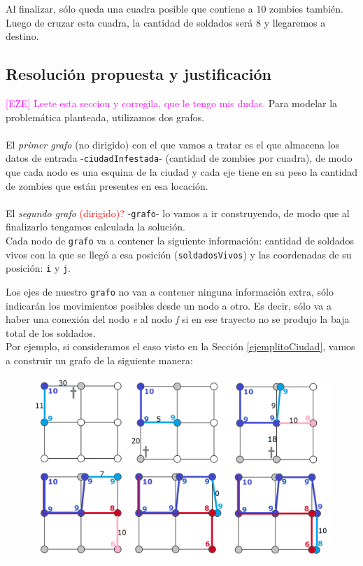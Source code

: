 Al finalizar, s\'olo queda una cuadra posible que contiene a $10$ zombies tambi\'en. Luego de cruzar esta cuadra, la cantidad de soldados ser\'a $8$ y llegaremos a destino.



\newpage
\subsection{Resoluci\'on propuesta y justificaci\'on}

\textcolor{magenta}{[EZE] Leete esta seccion y corregila, que le tengo mis dudas. }Para modelar la problem\'atica planteada, utilizamos dos grafos.\\
\\

El \emph{primer grafo} (no dirigido) con el que vamos a tratar es el que almacena los datos de entrada -\texttt{ciudadInfestada}- (cantidad de zombies por cuadra), de modo que cada nodo es una esquina de la ciudad y cada eje tiene en su peso la cantidad de zombies que est\'an presentes en esa locaci\'on.\\
\\

El \emph{segundo grafo} \textcolor{red}{(dirigido)?} -\texttt{grafo}- lo vamos a ir construyendo, de modo que al finalizarlo tengamos calculada la soluci\'on.\\

Cada nodo de \texttt{grafo} va a contener la siguiente informaci\'on: cantidad de soldados vivos con la que se lleg\'o a esa posici\'on (\texttt{soldadosVivos}) y las coordenadas de su posici\'on: \texttt{i} y \texttt{j}.

Los ejes de nuestro \texttt{grafo} no van a contener ninguna informaci\'on extra, s\'olo indicar\'an los movimientos posibles desde un nodo a otro. 
Es decir, s\'olo va a haber una conexi\'on del nodo \emph{e} al nodo \emph{f} si en ese trayecto no se produjo la baja total de los soldados.\\

Por ejemplo, si consideramos el caso visto en la Secci\'on \ref{ejemplitoCiudad}, vamos a construir un grafo de la siguiente manera:

  \begin{figure}[h!]
   \begin{center}
 	\includegraphics[scale=0.4]{imagenes/ej2/todos.png}
   \end{center}
 \end{figure}
 
